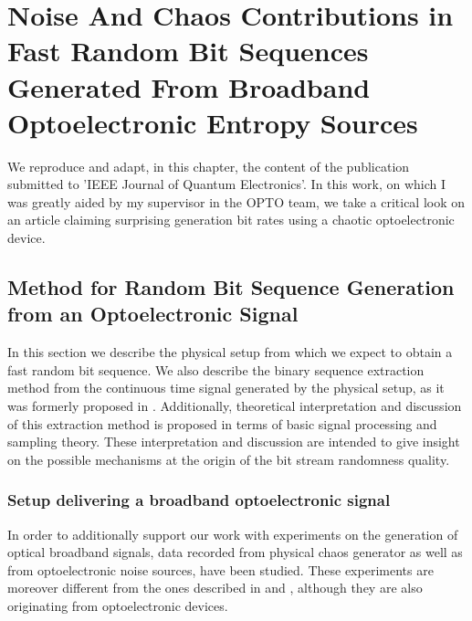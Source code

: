 \chapter{Noise And Chaos Contributions in Fast Random Bit Sequences Generated From Broadband Optoelectronic Entropy Sources}
\label{Noise And Chaos Contributions In Fast Random Bit Sequence Generated From Broadband Optoelectronic Entropy Sources}


We reproduce and adapt, in this chapter, the content of the publication~\cite{submit4}
submitted to 'IEEE Journal of Quantum Electronics'. In this work, on which I was greatly aided by my supervisor in the OPTO team,  we take a critical look on an article claiming surprising generation bit rates using a chaotic 
optoelectronic device.


\section{Method for Random Bit Sequence Generation from an Optoelectronic Signal}
\label{Method for random bit sequence generation}
In this section we describe the physical setup from which we expect to obtain a fast random bit sequence. We also describe the binary sequence extraction method from the continuous time signal generated by the physical setup, as it was formerly proposed in \cite{ultrafast2009,ultrafast2010}.  Additionally, theoretical interpretation and discussion of this extraction method is proposed in terms of basic signal processing and sampling theory. These interpretation and discussion are intended to give insight on the possible mechanisms at the origin of the bit stream randomness quality.
%
\subsection{Setup delivering a broadband optoelectronic signal}
\label{Setup delivering a broadband optoelectronic signal}
%
In order to additionally support our work with experiments on the generation of optical broadband signals, data recorded from physical chaos generator as well as from optoelectronic noise sources, have been studied. These experiments are moreover different from the ones described in \cite{ultrafast2009} and \cite{ultrafast2010}, although they are also originating from optoelectronic devices.

